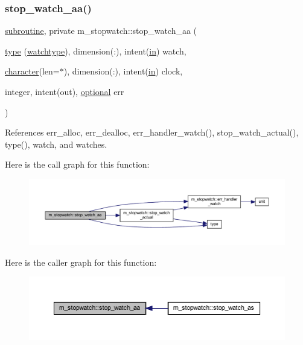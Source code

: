 \subsubsection{\texorpdfstring{stop\+\_\+watch\+\_\+aa()}{stop\_watch\_aa()}}
{\footnotesize\ttfamily \hyperlink{M__stopwatch_83_8txt_acfbcff50169d691ff02d4a123ed70482}{subroutine}, private m\+\_\+stopwatch\+::stop\+\_\+watch\+\_\+aa (\begin{DoxyParamCaption}\item[{\hyperlink{stop__watch_83_8txt_a70f0ead91c32e25323c03265aa302c1c}{type} (\hyperlink{structm__stopwatch_1_1watchtype}{watchtype}), dimension(\+:), intent(\hyperlink{M__journal_83_8txt_afce72651d1eed785a2132bee863b2f38}{in})}]{watch,  }\item[{\hyperlink{option__stopwatch_83_8txt_abd4b21fbbd175834027b5224bfe97e66}{character}(len=$\ast$), dimension(\+:), intent(\hyperlink{M__journal_83_8txt_afce72651d1eed785a2132bee863b2f38}{in})}]{clock,  }\item[{integer, intent(out), \hyperlink{option__stopwatch_83_8txt_aa4ece75e7acf58a4843f70fe18c3ade5}{optional}}]{err }\end{DoxyParamCaption})\hspace{0.3cm}{\ttfamily [private]}}



References err\+\_\+alloc, err\+\_\+dealloc, err\+\_\+handler\+\_\+watch(), stop\+\_\+watch\+\_\+actual(), type(), watch, and watches.

Here is the call graph for this function\+:
\nopagebreak
\begin{figure}[H]
\begin{center}
\leavevmode
\includegraphics[width=350pt]{namespacem__stopwatch_afa380a4a41a9059977ffef300380d8f2_cgraph}
\end{center}
\end{figure}
Here is the caller graph for this function\+:
\nopagebreak
\begin{figure}[H]
\begin{center}
\leavevmode
\includegraphics[width=350pt]{namespacem__stopwatch_afa380a4a41a9059977ffef300380d8f2_icgraph}
\end{center}
\end{figure}
\mbox{\label{namespacem__stopwatch_a24cd395f8edd9999704a1ba6444267e8}} 
